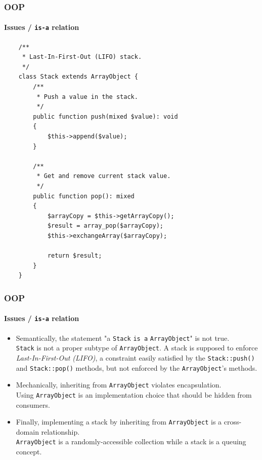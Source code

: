\begin{frame}[fragile,c]
    \frametitle{OOP}
    \framesubtitle{Issues / \texttt{is-a} relation}

    \begin{lstlisting}
    /**
     * Last-In-First-Out (LIFO) stack.
     */
    class Stack extends ArrayObject {
        /**
         * Push a value in the stack.
         */
        public function push(mixed $value): void
        {
            $this->append($value);
        }

        /**
         * Get and remove current stack value.
         */
        public function pop(): mixed
        {
            $arrayCopy = $this->getArrayCopy();
            $result = array_pop($arrayCopy);
            $this->exchangeArray($arrayCopy);

            return $result;
        }
    }
    \end{lstlisting}
\end{frame}

\begin{frame}
    \frametitle{OOP}
    \framesubtitle{Issues / \texttt{is-a} relation}

    \begin{itemize}
        \item Semantically, the statement "a \texttt{Stack} \texttt{is a} \texttt{ArrayObject}"
              is not true.\pause
              \textcolor{ecgrey!50}{
              \\\texttt{Stack} is not a proper subtype of \texttt{ArrayObject}.
              A stack is supposed to enforce \textit{Last-In-First-Out (LIFO)}, a constraint easily
              satisfied by the \texttt{Stack::push()} and \texttt{Stack::pop()} methods,
              but not enforced by the \texttt{ArrayObject}’s methods.}
        \pause
        \item Mechanically, inheriting from \texttt{ArrayObject} violates encapsulation.\pause
              \textcolor{ecgrey!50}{
              \\Using \texttt{ArrayObject} is an implementation choice that should be
              hidden from consumers.}
        \pause
        \item Finally, implementing a stack by inheriting from \texttt{ArrayObject} is
              a cross-domain relationship.\pause
              \textcolor{ecgrey!50}{
              \\\texttt{ArrayObject} is a randomly-accessible collection while a stack is
              a queuing concept.}
    \end{itemize}
\end{frame}

